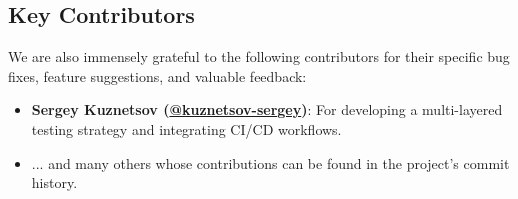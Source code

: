 \subsection*{Key Contributors} %

We are also immensely grateful to the following contributors for their specific bug fixes, feature suggestions, and valuable feedback:

\begin{itemize}
    \item \textbf{Sergey Kuznetsov (\href{https://github.com/kuznetsov-sergey-rdt}{@kuznetsov-sergey})}: For developing a multi-layered testing strategy and integrating CI/CD workflows.
    \item ... and many others whose contributions can be found in the project's commit history.
\end{itemize}